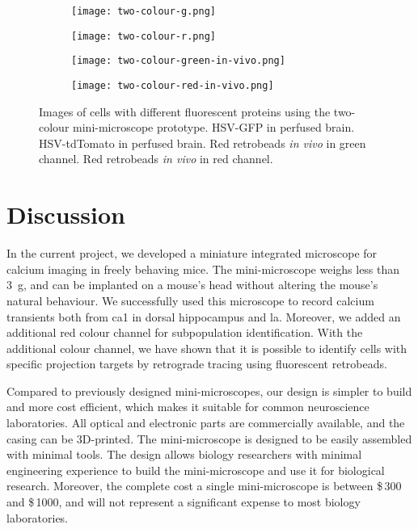 \begin{figure}[h]
    \begin{subfigure}[t]{.5\linewidth}
        \texttt{[image: two-colour-g.png]}
        \caption{\label{f.twocolour.g}}
    \end{subfigure}
    \begin{subfigure}[t]{.5\linewidth}
        \texttt{[image: two-colour-r.png]}
        \caption{\label{f.twocolour.r}}
    \end{subfigure}
    \begin{subfigure}[t]{.5\linewidth}
        \texttt{[image: two-colour-green-in-vivo.png]}
        \caption{\label{f.twocolour.g.invivo}}
    \end{subfigure}
    \begin{subfigure}[t]{.5\linewidth}
        \texttt{[image: two-colour-red-in-vivo.png]}
        \caption{\label{f.twocolour.r.invivo}}
    \end{subfigure}

    \caption[Images under both green and red channel. ]{Images of cells with different fluorescent proteins using the two-colour mini-microscope prototype.  HSV-GFP in perfused brain.  HSV-tdTomato in perfused brain.  Red retrobeads \textit{in vivo} in green channel.  Red retrobeads \textit{in vivo} in red channel. \label{f.twocolour}}
\end{figure}

\section{Discussion}

In the current project, we developed a miniature integrated microscope for calcium imaging in freely behaving mice. The mini-microscope weighs less than \SI{3}{\gram}, and can be implanted on a mouse's head without altering the mouse's natural behaviour. We successfully used this microscope to record calcium transients both from \gls{ca1} in dorsal hippocampus and \gls{la}. Moreover, we added an additional red colour channel for subpopulation identification. With the additional colour channel, we have shown that it is possible to identify cells with specific projection targets by retrograde tracing using fluorescent retrobeads. 

Compared to previously designed mini-microscopes, our design is simpler to build and more cost efficient, which makes it suitable for common neuroscience laboratories. All optical and electronic parts are commercially available, and the casing can be 3D-printed. The mini-microscope is designed to be easily assembled with minimal tools. The design allows biology researchers with minimal engineering experience to build the mini-microscope and use it for biological research. Moreover, the complete cost a single mini-microscope is between \$\,300 and \$\,1000, and will not represent a significant expense to most biology laboratories.

